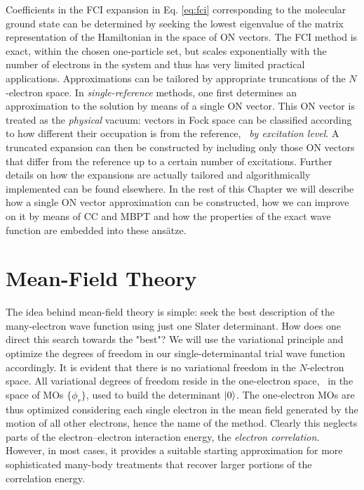 Coefficients in the \acrshort{FCI} expansion in Eq. \eqref{eq:fci} corresponding to the molecular ground
state can be determined by seeking the lowest eigenvalue of the matrix
representation of the Hamiltonian in the space of \acrshort{ON} vectors.
The \acrshort{FCI} method is exact, within the chosen one-particle set,
but scales exponentially with the number of electrons in the system and
thus has very limited practical applications.
Approximations can be tailored by appropriate truncations of the
$N$-electron space.
In \emph{single-reference} methods, one first determines an
approximation to the solution by means of a single \acrshort{ON} vector.
This \acrshort{ON} vector is treated as the \emph{physical} vacuum:
vectors in Fock space can be classified according to how different their
occupation is from the reference, \ie~\emph{by excitation
level}.\autocite{Helgaker2000-tz, Shavitt2009-mr}
A truncated expansion can then be constructed by including only those
\acrshort{ON} vectors that differ from the reference up to a certain
number of excitations.
Further details on how the expansions are actually tailored and
algorithmically implemented can be found elsewhere.\autocite{Helgaker2000-tz}
In the rest of this Chapter we will describe how a single \acrshort{ON}
vector approximation can be constructed, how we can improve on it by
means of \acrlong{CC} and \acrlong{MBPT} and how the properties of the
exact wave function are embedded into these ans\"{a}tze.

\section{Mean-Field Theory}\label{sec:mean-field}

The idea behind mean-field theory is simple: seek the best description
of the many-electron wave function using just one Slater determinant.
How does one direct this search towards the "best"? We will use the
variational principle and optimize the degrees of freedom in our
single-determinantal trial wave function accordingly.
It is evident that there is no variational freedom in the
$N$-electron space. All variational degrees of freedom reside in
the one-electron space, \ie~in the space of \glspl{MO}
$\lbrace\phi_r\rbrace$, used to build the determinant $\Ket{0}$.
The one-electron \glspl{MO} are thus optimized considering each single
electron in the mean field generated by the motion of all other
electrons, hence the name of the method. Clearly this neglects
parts of the electron--electron interaction energy, the \emph{electron
correlation}. However, in most cases, it provides a suitable starting
approximation for more sophisticated many-body treatments that recover
larger portions of the correlation energy.

